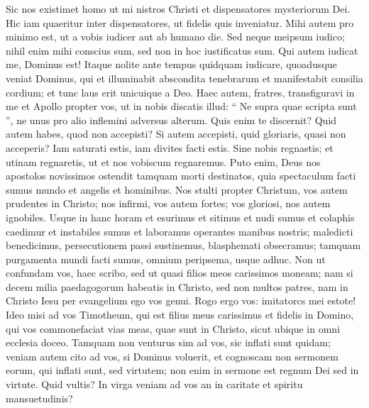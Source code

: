 \begin{biblechapter}
\begin{biblechapter}
\begin{biblechapter}
\begin{biblechapter}
\verse Sic nos existimet homo ut mi nistros Christi et dispensatores mysteriorum Dei. 
\verse Hic iam quaeritur inter dispensatores, ut fidelis quis inveniatur. 
\verse Mihi autem pro minimo est, ut a vobis iudicer aut ab humano die. Sed neque meipsum iudico; 
 \verse nihil enim mihi conscius sum, sed non in hoc iustificatus sum. Qui autem iudicat me, Dominus est! 
\verse Itaque nolite ante tempus quidquam iudicare, quoadusque veniat Dominus, qui et illuminabit abscondita tenebrarum et manifestabit consilia cordium; et tunc laus erit unicuique a Deo.
 \verse Haec autem, fratres, transfiguravi in me et Apollo propter vos, ut in nobis discatis illud: “ Ne supra quae scripta sunt ”, ne unus pro alio inflemini adversus alterum. 
\verse Quis enim te discernit? Quid autem habes, quod non accepisti? Si autem accepisti, quid gloriaris, quasi non acceperis?
 \verse Iam saturati estis, iam divites facti estis. Sine nobis regnastis; et utinam regnaretis, ut et nos vobiscum regnaremus. 
\verse Puto enim, Deus nos apostolos novissimos ostendit tamquam morti destinatos, quia spectaculum facti sumus mundo et angelis et hominibus. 
\verse Nos stulti propter Christum, vos autem prudentes in Christo; nos infirmi, vos autem fortes; vos gloriosi, nos autem ignobiles. 
 \verse Usque in hanc horam et esurimus et sitimus et nudi sumus et colaphis caedimur et instabiles sumus 
\verse et laboramus operantes manibus nostris; maledicti benedicimus, persecutionem passi sustinemus, 
\verse blasphemati obsecramus; tamquam purgamenta mundi facti sumus, omnium peripsema, usque adhuc.
 \verse Non ut confundam vos, haec scribo, sed ut quasi filios meos carissimos moneam; 
\verse nam si decem milia paedagogorum habeatis in Christo, sed non multos patres, nam in Christo Iesu per evangelium ego vos genui. 
\verse Rogo ergo vos: imitatorcs mei estote! 
\verse Ideo misi ad vos Timotheum, qui est filius meus carissimus et fidelis in Domino, qui vos commonefaciat vias meas, quae sunt in Christo, sicut ubique in omni ecclesia doceo.
 \verse Tamquam non venturus sim ad vos, sic inflati sunt quidam; 
\verse veniam autem cito ad vos, si Dominus voluerit, et cognoscam non sermonem eorum, qui inflati sunt, sed virtutem; 
\verse non enim in sermone est regnum Dei sed in virtute. 
 \verse Quid vultis? In virga veniam ad vos an in caritate et spiritu mansuetudinis?
 

\end{biblechapter}
\end{biblechapter}
\end{biblechapter}
\end{biblechapter}

